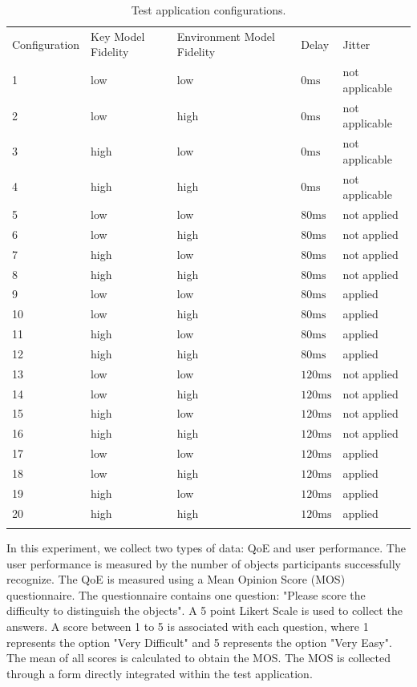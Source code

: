 \begin{table}[!htbp]
\caption{Test application configurations.}
\label{tab:pus}
\begin{tabular}{lllll}
\hline\noalign{\smallskip}
Configuration & Key Model Fidelity & Environment Model Fidelity & Delay & Jitter \\
\noalign{\smallskip}\hline\noalign{\smallskip}
1 & low & low & $0\mathrm{ms}$ & not applicable \\
2 & low & high & $0\mathrm{ms}$ & not applicable \\
3 & high & low & $0\mathrm{ms}$ & not applicable \\
4 & high & high & $0\mathrm{ms}$ & not applicable \\
5 & low & low & $80\mathrm{ms}$ & not applied \\
6 & low & high & $80\mathrm{ms}$ & not applied \\
7 & high & low & $80\mathrm{ms}$ & not applied \\
8 & high & high & $80\mathrm{ms}$ & not applied \\
9 & low & low & $80\mathrm{ms}$ & applied \\
10 & low & high & $80\mathrm{ms}$ & applied \\
11 & high & low & $80\mathrm{ms}$ & applied \\
12 & high & high & $80\mathrm{ms}$ & applied \\
13 & low & low & $120\mathrm{ms}$ & not applied \\
14 & low & high & $120\mathrm{ms}$ & not applied \\
15 & high & low & $120\mathrm{ms}$ & not applied \\
16 & high & high & $120\mathrm{ms}$ & not applied \\
17 & low & low & $120\mathrm{ms}$ & applied \\
18 & low & high & $120\mathrm{ms}$ & applied \\
19 & high & low & $120\mathrm{ms}$ & applied \\
20 & high & high & $120\mathrm{ms}$ & applied \\
\noalign{\smallskip}\hline
\end{tabular}
\end{table}

In this experiment, we collect two types of data: QoE and user performance.
The user performance is measured by the number of objects participants successfully recognize.
The QoE is measured using a Mean Opinion Score (MOS) questionnaire. The questionnaire contains one question: "Please score the difficulty to distinguish the objects". A 5 point Likert Scale is used to collect the answers. A score between 1 to 5 is associated with each question, where 1 represents the option "Very Difficult" and 5 represents the option "Very Easy". The mean of all scores is calculated to obtain the MOS. The MOS is collected through a form directly integrated within the test application.

